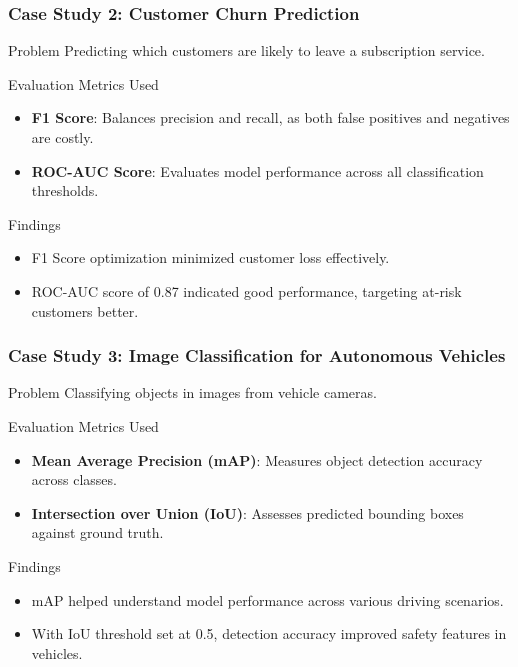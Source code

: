 \documentclass{beamer}
\begin{document}
\begin{frame}[fragile]
    \frametitle{Case Study 2: Customer Churn Prediction}
    \begin{block}{Problem}
        Predicting which customers are likely to leave a subscription service.
    \end{block}
    \begin{block}{Evaluation Metrics Used}
        \begin{itemize}
            \item \textbf{F1 Score}: Balances precision and recall, as both false positives and negatives are costly.
            \item \textbf{ROC-AUC Score}: Evaluates model performance across all classification thresholds.
        \end{itemize}
    \end{block}
    \begin{block}{Findings}
        \begin{itemize}
            \item F1 Score optimization minimized customer loss effectively.
            \item ROC-AUC score of 0.87 indicated good performance, targeting at-risk customers better.
        \end{itemize}
    \end{block}
\end{frame}

\begin{frame}[fragile]
    \frametitle{Case Study 3: Image Classification for Autonomous Vehicles}
    \begin{block}{Problem}
        Classifying objects in images from vehicle cameras.
    \end{block}
    \begin{block}{Evaluation Metrics Used}
        \begin{itemize}
            \item \textbf{Mean Average Precision (mAP)}: Measures object detection accuracy across classes.
            \item \textbf{Intersection over Union (IoU)}: Assesses predicted bounding boxes against ground truth.
        \end{itemize}
    \end{block}
    \begin{block}{Findings}
        \begin{itemize}
            \item mAP helped understand model performance across various driving scenarios.
            \item With IoU threshold set at 0.5, detection accuracy improved safety features in vehicles.
        \end{itemize}
    \end{block}
\end{frame}
\end{document}
